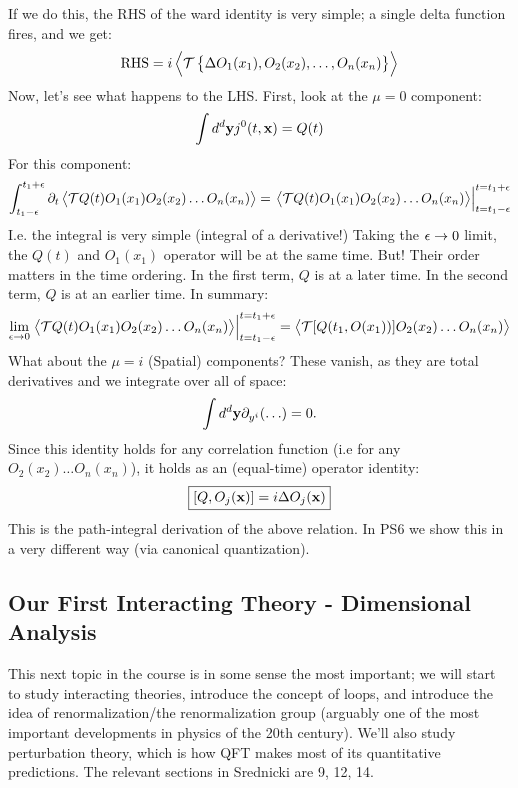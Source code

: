 If we do this, the RHS of the ward identity is very simple; a single delta function fires, and we get:
\begin{equation}
    \text{RHS} = i\left< \mathcal{T}\set{\Delta O_1(x_1), O_2(x_2), \ldots, O_n(x_n)} \right>
\end{equation}
Now, let's see what happens to the LHS. First, look at the $\mu = 0$ component:
\begin{equation}
    \int d^d \mathbf{y} j^0(t, \mathbf{x}) = Q(t)
\end{equation}
For this component:
\begin{equation}
    \begin{split}
        \int_{t_1-\epsilon}^{t_1+\epsilon} \partial_t\left< \mathcal{T}Q(t)O_1(x_1)O_2(x_2)\ldots O_n(x_n) \right> = \left.\left< \mathcal{T}Q(t)O_1(x_1)O_2(x_2)\ldots O_n(x_n) \right>\right|_{t = t_1-\epsilon}^{t = t_1 + \epsilon}
    \end{split}
\end{equation}
I.e. the integral is very simple (integral of a derivative!) Taking the $\epsilon \to 0$ limit, the $Q(t)$ and $O_1(x_1)$ operator will be at the same time. But! Their order matters in the time ordering. In the first term, $Q$ is at a later time. In the second term, $Q$ is at an earlier time. In summary:
\begin{equation}
    \lim_{\epsilon \to 0}\left.\left< \mathcal{T}Q(t)O_1(x_1)O_2(x_2)\ldots O_n(x_n) \right>\right|_{t = t_1-\epsilon}^{t = t_1 + \epsilon} = \left< \mathcal{T}[Q(t_1, O(x_1))]O_2(x_2)\ldots O_n(x_n) \right>
\end{equation}
What about the $\mu = i$ (Spatial) components? These vanish, as they are total derivatives and we integrate over all of space:
\begin{equation}
    \int d^d\mathbf{y}\partial_{y^i}(\ldots) = 0.
\end{equation}
Since this identity holds for any correlation function (i.e for any $O_2(x_2)\ldots O_n(x_n)$), it holds as an (equal-time) operator identity:
\begin{equation}
    \boxed{[Q, O_j(\mathbf{x})] = i\Delta O_j(\mathbf{x})}
\end{equation}
This is the path-integral derivation of the above relation. In PS6 we show this in a very different way (via canonical quantization).

\subsection{Our First Interacting Theory - Dimensional Analysis}
This next topic in the course is in some sense the most important; we will start to study interacting theories, introduce the concept of loops, and introduce the idea of renormalization/the renormalization group (arguably one of the most important developments in physics of the 20th century). We'll also study perturbation theory, which is how QFT makes most of its quantitative predictions. The relevant sections in Srednicki are 9, 12, 14.

